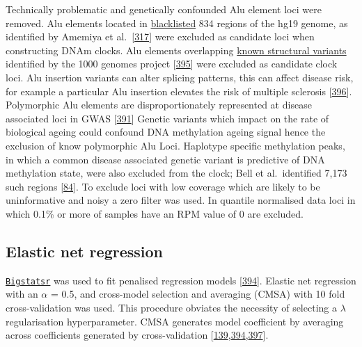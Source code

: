 \documentclass[
]{book}
\begin{document}
Technically problematic and genetically confounded Alu element loci were removed.
Alu elements located in \href{https://github.com/Boyle-Lab/Blacklist/raw/master/lists/hg19-blacklist.v2.bed.gz}{blacklisted} 834 regions of the hg19 genome, as identified by Amemiya et al.~{[}\protect\hyperlink{ref-Amemiya2019}{317}{]} were excluded as candidate loci when constructing DNAm clocks.
Alu elements overlapping \href{ftp://ftp.1000genomes.ebi.ac.uk/vol1/ftp/phase3/integrated_sv_map/ALL.wgs.mergedSV.v8.20130502.svs.genotypes.vcf.gz}{known structural variants} identified by the 1000 genomes project {[}\protect\hyperlink{ref-Fairley2020}{395}{]} were excluded as candidate clock loci.
Alu insertion variants can alter splicing patterns, this can affect disease risk, for example a particular Alu insertion elevates the risk of multiple sclerosis {[}\protect\hyperlink{ref-Payer2019}{396}{]}.
Polymorphic Alu elements are disproportionately represented at disease associated loci in GWAS {[}\protect\hyperlink{ref-Payer2017}{391}{]}
Genetic variants which impact on the rate of biological ageing could confound DNA methylation ageing signal hence the exclusion of know polymorphic Alu Loci.
Haplotype specific methylation peaks, in which a common disease associated genetic variant is predictive of DNA methylation state, were also excluded from the clock; Bell et al.~identified 7,173 such regions {[}\protect\hyperlink{ref-Bell2017a}{84}{]}.
To exclude loci with low coverage which are likely to be uninformative and noisy a zero filter was used.
In quantile normalised data loci in which 0.1\% or more of samples have an RPM value of 0 are excluded.

\hypertarget{elastic-net-regression}{%
\subsection{Elastic net regression}\label{elastic-net-regression}}

\href{https://privefl.github.io/bigstatsr/}{\texttt{Bigstatsr}} was used to fit penalised regression models {[}\protect\hyperlink{ref-Prive2019}{394}{]}.
Elastic net regression with an \(\alpha\) = 0.5, and cross-model selection and averaging (CMSA) with 10 fold cross-validation was used.
This procedure obviates the necessity of selecting a \(\lambda\) regularisation hyperparameter.
CMSA generates model coefficient by averaging across coefficients generated by cross-validation {[}\protect\hyperlink{ref-Friedman2010}{139},\protect\hyperlink{ref-Prive2019}{394},\protect\hyperlink{ref-Tibshirani2012}{397}{]}.
\end{document}
